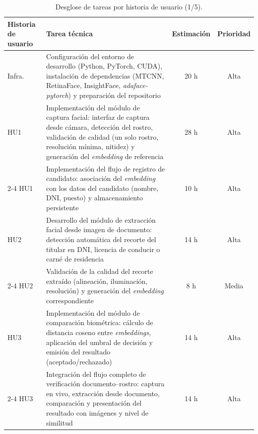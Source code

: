 \documentclass[
  11pt, %
]{charter}
\begin{document}
\begin{table}[htpb]
  \centering
  \caption{Desglose de tareas por historia de usuario (1/5).}
  \begin{tabularx}{\linewidth}{@{}|X|X|c|c|@{}}
    \hline
    \rowcolor[HTML]{C0C0C0}
    Historia de usuario & Tarea técnica & Estimación & Prioridad \\ \hline

    Infra. & Configuración del entorno de desarrollo (Python, PyTorch, CUDA), instalación de dependencias (MTCNN, RetinaFace, InsightFace, \textit{adaface-pytorch}) y preparación del repositorio & 20 h & Alta \\ \hline
    HU1 & Implementación del módulo de captura facial: interfaz de captura desde cámara, detección del rostro, validación de calidad (un solo rostro, resolución mínima, nitidez) y generación del \textit{embedding} de referencia & 28 h & Alta \\ \cline{2-4}
    HU1 & Implementación del flujo de registro de candidato: asociación del \textit{embedding} con los datos del candidato (nombre, DNI, puesto) y almacenamiento persistente & 10 h & Alta \\ \hline

    HU2 & Desarrollo del módulo de extracción facial desde imagen de documento: detección automática del recorte del titular en DNI, licencia de conducir o carné de residencia & 14 h & Alta \\ \cline{2-4}
    HU2 & Validación de la calidad del recorte extraído (alineación, iluminación, resolución) y generación del \textit{embedding} correspondiente & 8 h & Media \\ \hline

    HU3 & Implementación del módulo de comparación biométrica: cálculo de distancia coseno entre \textit{embeddings}, aplicación del umbral de decisión y emisión del resultado (aceptado/rechazado) & 14 h & Alta \\ \cline{2-4}
    HU3 & Integración del flujo completo de verificación documento--rostro: captura en vivo, extracción desde documento, comparación y presentación del resultado con imágenes y nivel de similitud & 14 h & Alta \\ \hline

  \end{tabularx}
\end{table}
\end{document}
